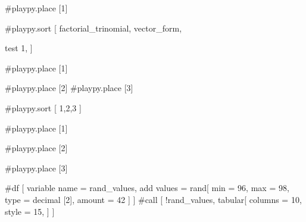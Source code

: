 \documentclass{article}
\begin{document}
\begin{enumerate}

    #playpy.place [1]

    #playpy.sort [
        factorial_trinomial,
        vector_form,

        test 1,
    ]

    #playpy.place [1]
    
    #playpy.place [2]
    #playpy.place [3]

    #playpy.sort [
        1,2,3
    ]

    #playpy.place [1]

    #playpy.place [2]

    #playpy.place [3]


\end{enumerate}

#df [
        variable name = rand_values,
        add values = rand[
            min = 96,
            max = 98,
            type = decimal [2],
            amount = 42
        ]
    ] #call [
        !rand_values,
        tabular[
            columns = 10,
            style = 15,
        ]
    ]
\end{document}
